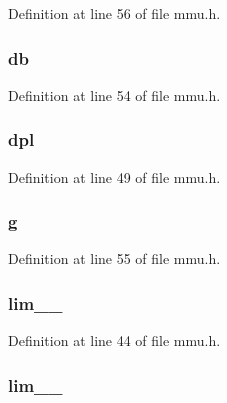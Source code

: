 Definition at line 56 of file mmu.\-h.

\hypertarget{structsegdesc_a04ab5582b63d915355818185ba20a9c4}{
\subsubsection[{db}]{ db}}\label{structsegdesc_a04ab5582b63d915355818185ba20a9c4}


Definition at line 54 of file mmu.\-h.

\hypertarget{structsegdesc_af007c16108fee6bd537fac7128283b6e}{
\subsubsection[{dpl}]{ dpl}}\label{structsegdesc_af007c16108fee6bd537fac7128283b6e}


Definition at line 49 of file mmu.\-h.

\hypertarget{structsegdesc_a507f46d64a589eaa3bf729789889283c}{
\subsubsection[{g}]{ g}}\label{structsegdesc_a507f46d64a589eaa3bf729789889283c}


Definition at line 55 of file mmu.\-h.

\hypertarget{structsegdesc_aa05f1f5cdd8d56cc9f8c331ceeda7813}{
\subsubsection[{lim\-\_\-15\-\_\-0}]{ lim\-\_\-\_}}\label{structsegdesc_aa05f1f5cdd8d56cc9f8c331ceeda7813}


Definition at line 44 of file mmu.\-h.

\hypertarget{structsegdesc_abe13981739b3fcc0205ee38da6c18cc9}{
\subsubsection[{lim\-\_\-19\-\_\-16}]{ lim\-\_\-\_}}\label{structsegdesc_abe13981739b3fcc0205ee38da6c18cc9}


